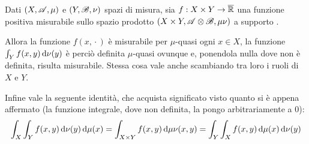 \begin{theorem}[Tonelli]
	Dati $(X,\mathscr A,\mu)$ e $(Y,\mathscr B,\nu)$ spazi di misura, sia $f:X\times Y\to \overline{\mathbb R}$ una funzione positiva misurabile sullo spazio prodotto $(X\times Y,\mathscr A\otimes\mathscr B,\mu\nu)$ a supporto \sigfin[o].

	Allora la funzione $f(x,{}\cdot{})$ è misurabile per $\mu$-quasi ogni $x\in X$, la funzione $\int_Y f(x,y)\,\mathrm d\nu(y)$ è perciò definita $\mu$-quasi ovunque e, ponendola nulla dove non è definita, risulta misurabile. Stessa cosa vale anche scambiando tra loro i ruoli di $X$ e $Y$.
	
	Infine vale la seguente identità, che acquista significato visto quanto si è appena affermato (la funzione integrale, dove non definita, la pongo arbitrariamente a $0$):
	\begin{equation*}
		\int_X\int_Y f(x,y)\,\mathrm d\nu(y)\,\mathrm d\mu(x)=\int_{X\times Y}f(x,y)\,\mathrm d\mu\nu(x,y)=\int_Y\int_Xf(x,y)\,\mathrm d\mu(x)\,\mathrm d\nu(y)
	\end{equation*}
\end{theorem}
